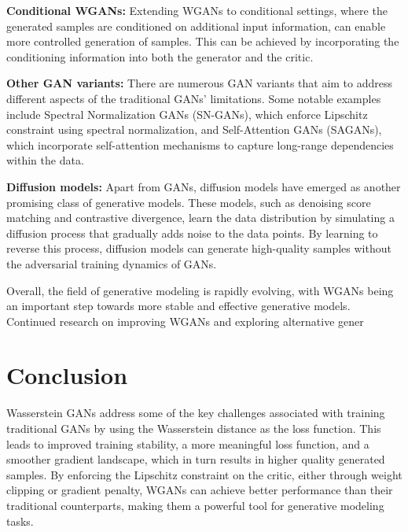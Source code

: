     \textbf{Conditional WGANs:} Extending WGANs to conditional settings, where the generated samples are conditioned on additional input information, can enable more controlled generation of samples. This can be achieved by incorporating the conditioning information into both the generator and the critic.

    \textbf{Other GAN variants:} There are numerous GAN variants that aim to address different aspects of the traditional GANs' limitations. Some notable examples include Spectral Normalization GANs (SN-GANs), which enforce Lipschitz constraint using spectral normalization, and Self-Attention GANs (SAGANs), which incorporate self-attention mechanisms to capture long-range dependencies within the data.

    \textbf{Diffusion models:} Apart from GANs, diffusion models have emerged as another promising class of generative models. These models, such as denoising score matching and contrastive divergence, learn the data distribution by simulating a diffusion process that gradually adds noise to the data points. By learning to reverse this process, diffusion models can generate high-quality samples without the adversarial training dynamics of GANs.

Overall, the field of generative modeling is rapidly evolving, with WGANs being an important step towards more stable and effective generative models. Continued research on improving WGANs and exploring alternative gener

\section{Conclusion}

Wasserstein GANs address some of the key challenges associated with training traditional GANs by using the Wasserstein distance as the loss function. This leads to improved training stability, a more meaningful loss function, and a smoother gradient landscape, which in turn results in higher quality generated samples. By enforcing the Lipschitz constraint on the critic, either through weight clipping or gradient penalty, WGANs can achieve better performance than their traditional counterparts, making them a powerful tool for generative modeling tasks.